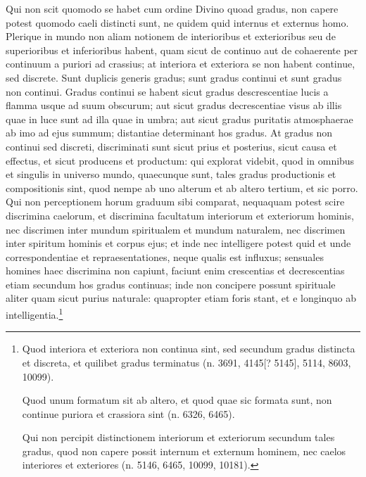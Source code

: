 \begin{topic}{38}
    Qui non scit quomodo se habet cum ordine Divino quoad gradus, non capere potest quomodo caeli distincti sunt, ne
    quidem quid internus et externus homo.
    Plerique in mundo non aliam notionem de interioribus et exterioribus seu de superioribus et inferioribus habent,
    quam sicut de continuo aut de cohaerente per continuum a puriori ad crassius; at interiora et exteriora se non
    habent continue, sed discrete.
    Sunt duplicis generis gradus; sunt gradus continui et sunt gradus non continui.
    Gradus continui se habent sicut gradus descrescentiae lucis a flamma usque ad suum obscurum; aut sicut gradus
    decrescentiae visus ab illis quae in luce sunt ad illa quae in umbra; aut sicut gradus puritatis atmosphaerae ab imo
    ad ejus summum; distantiae determinant hos gradus.
    At gradus non continui sed discreti, discriminati sunt sicut prius et posterius, sicut causa et effectus, et sicut
    producens et productum: qui explorat videbit, quod in omnibus et singulis in universo mundo, quaecunque sunt, tales
    gradus productionis et compositionis sint, quod nempe ab uno alterum et ab altero tertium, et sic porro.
    Qui non perceptionem horum graduum sibi comparat, nequaquam potest scire discrimina caelorum, et discrimina
    facultatum interiorum et exteriorum hominis, nec discrimen inter mundum spiritualem et mundum naturalem, nec
    discrimen inter spiritum hominis et corpus ejus; et inde nec intelligere potest quid et unde correspondentiae et
    repraesentationes, neque qualis est influxus; sensuales homines haec discrimina non capiunt, faciunt enim
    crescentias et decrescentias etiam secundum hos gradus continuas; inde non concipere possunt spirituale aliter quam
    sicut purius naturale: quapropter etiam foris stant, et e longinquo ab intelligentia.\footnote{Quod interiora et
    exteriora non continua sint, sed secundum gradus distincta et discreta, et quilibet gradus terminatus (n. 3691,
    4145[? 5145], 5114, 8603, 10099).

    Quod unum formatum sit ab altero, et quod quae sic formata sunt, non continue puriora et crassiora sint (n. 6326,
    6465).

    Qui non percipit distinctionem interiorum et exteriorum secundum tales gradus, quod non capere possit internum et
    externum hominem, nec caelos interiores et exteriores (n. 5146, 6465, 10099, 10181).}
\end{topic}

